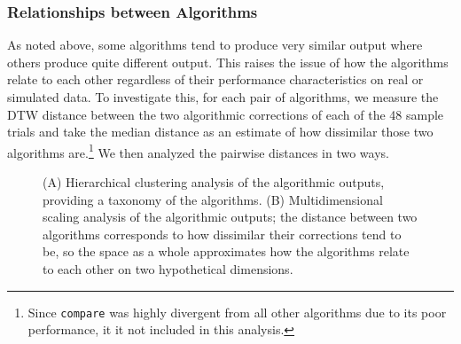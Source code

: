 \documentclass[doc,biblatex]{apa7}
\begin{document}
\subsubsection{Relationships between Algorithms}

As noted above, some algorithms tend to produce very similar output where others produce quite different output. This raises the issue of how the algorithms relate to each other regardless of their performance characteristics on real or simulated data. To investigate this, for each pair of algorithms, we measure the DTW distance between the two algorithmic corrections of each of the 48 sample trials and take the median distance as an estimate of how dissimilar those two algorithms are.\footnote{Since \texttt{compare} was highly divergent from all other algorithms due to its poor performance, it it not included in this analysis.} We then analyzed the pairwise distances in two ways.

	\begin{figure}
	\vspace*{2pt}
	\caption{(A) Hierarchical clustering analysis of the algorithmic outputs, providing a taxonomy of the algorithms. (B) Multidimensional scaling analysis of the algorithmic outputs; the distance between two algorithms corresponds to how dissimilar their corrections tend to be, so the space as a whole approximates how the algorithms relate to each other on two hypothetical dimensions.}
	\label{fig12}
	\end{figure}
\end{document}
